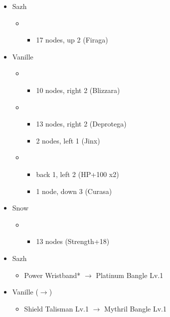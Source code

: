 \begin{menu}
	\begin{itemize}
		\crystarium
		\begin{itemize}
			\item Sazh
				\begin{itemize}
					\item \rav
						\begin{itemize}
							\item 17 nodes, up 2 (Firaga)
						\end{itemize}
				\end{itemize}
			\item Vanille
				\begin{itemize}
					\item \rav
						\begin{itemize}
							\item 10 nodes, right 2 (Blizzara)
						\end{itemize}
					\item \sab
						\begin{itemize}
							\item 13 nodes, right 2 (Deprotega)
							\item 2 nodes, left 1 (Jinx)
						\end{itemize}
					\item \med
						\begin{itemize}
							\item back 1, left 2 (HP+100 x2)
							\item 1 node, down 3 (Curasa)
						\end{itemize}
				\end{itemize}
			\item Snow
				\begin{itemize}
					\item \sen
						\begin{itemize}
							\item 13 nodes (Strength+18)
						\end{itemize}
				\end{itemize}							      	
		\end{itemize}
		\equip
		\begin{itemize}
			\item Sazh
				\begin{itemize}
					\item Power Wristband* $\rightarrow$ Platinum Bangle Lv.1
				\end{itemize}
			\item Vanille ($\rightarrow$)
				\begin{itemize}
					\item Shield Talisman Lv.1 $\rightarrow$ Mythril Bangle Lv.1
				\end{itemize}
		\end{itemize}
	\end{itemize}
\end{menu}

